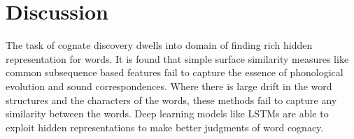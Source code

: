 \documentclass[11pt,letterpaper]{article}
\begin{document}



\section{Discussion}

The task of cognate discovery dwells into domain of finding rich hidden representation for words. It is found that simple surface similarity measures like common subsequence based features fail to capture the essence of phonological evolution and sound correspondences. Where there is large drift in the word structures and the characters of the words, these methods fail to capture any similarity between the words. Deep learning models like LSTMs are able to exploit hidden representations to make better judgments of word cognacy. 
\end{document}
